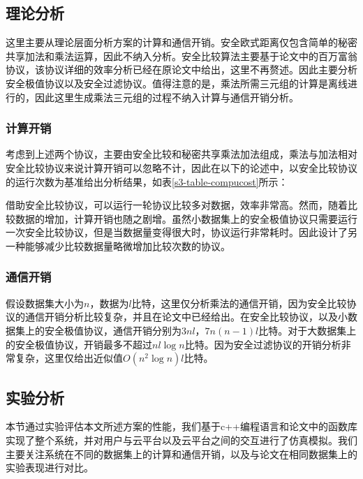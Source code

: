 \subsection{理论分析}
这里主要从理论层面分析方案的计算和通信开销。安全欧式距离仅包含简单的秘密共享加法和乘法运算，因此不纳入分析。安全比较算法主要基于论文\cite{rathee2020cryptflow2}中的百万富翁协议，该协议详细的效率分析已经在原论文中给出，这里不再赘述。因此主要分析安全极值协议以及安全过滤协议。值得注意的是，乘法所需三元组的计算是离线进行的，因此这里生成乘法三元组的过程不纳入计算与通信开销分析。
\subsubsection{计算开销}
考虑到上述两个协议，主要由安全比较和秘密共享乘法加法组成，乘法与加法相对安全比较协议来说计算开销可以忽略不计，因此在以下的论述中，以安全比较协议的运行次数为基准给出分析结果，如表\ref{s3-table-compucost}所示：
\begin{table}[htbp]
	\centering
	\renewcommand{\arraystretch}{1.3}
	\caption{计算开销理论分析}
	\label{s3-table-compucost}
\end{table}

借助安全比较协议，可以运行一轮协议比较多对数据，效率非常高。然而，随着比较数据的增加，计算开销也随之剧增。虽然小数据集上的安全极值协议只需要运行一次安全比较协议，但是当数据量变得很大时，协议运行非常耗时。因此设计了另一种能够减少比较数据量略微增加比较次数的协议。

\subsubsection{通信开销}
假设数据集大小为$ n $，数据为$ l$比特，这里仅分析乘法的通信开销，因为安全比较协议的通信开销分析比较复杂，并且在论文\cite{rathee2020cryptflow2}中已经给出。在安全比较协议，以及小数据集上的安全极值协议，通信开销分别为$ 3nl $，$ 7n(n-1)l $比特。对于大数据集上的安全极值协议，开销最多不超过$ nl\log n $比特。因为安全过滤协议的开销分析非常复杂，这里仅给出近似值$ O(n^2\log n)l $比特。
\subsection{实验分析}
本节通过实验评估本文所述方案的性能，我们基于c++编程语言和论文\cite{rathee2020cryptflow2}中的函数库实现了整个系统，并对用户与云平台以及云平台之间的交互进行了仿真模拟。我们主要关注系统在不同的数据集上的计算和通信开销，以及与论文\cite{wu2020secure,mohassel2019practical,jaschke2019unsupervised}在相同数据集上的实验表现进行对比。

